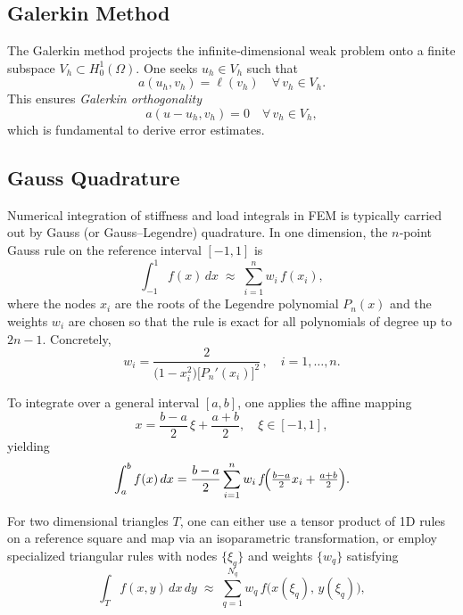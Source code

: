\subsection{Galerkin Method}

The Galerkin method projects the infinite‐dimensional weak problem onto a finite subspace $V_h\subset H_0^1(\Omega)$.  One seeks $u_h\in V_h$ such that
\begin{equation}
  a(u_h,v_h)=\ell(v_h)
  \quad\forall\,v_h\in V_h.
\end{equation}
This ensures \emph{Galerkin orthogonality}
\begin{equation}
  a(u-u_h,v_h)=0
  \quad\forall\,v_h\in V_h,
\end{equation}
which is fundamental to derive error estimates. \citep{ErnGuermond2004}

\subsection{Gauss Quadrature}

Numerical integration of stiffness and load integrals in FEM is typically carried out by Gauss (or Gauss–Legendre) quadrature.  In one dimension, the $n$‐point Gauss rule on the reference interval $[-1,1]$ is
\begin{equation}
  \int_{-1}^{1} f(x)\,dx
  \;\approx\;
  \sum_{i=1}^{n} w_i\,f(x_i),
\end{equation}
where the nodes $x_i$ are the roots of the Legendre polynomial $P_n(x)$ and the weights $w_i$ are chosen so that the rule is exact for all polynomials of degree up to $2n-1$.  Concretely,
\begin{equation}
  w_i = \frac{2}{\bigl(1 - x_i^2\bigr)\bigl[P_n'(x_i)\bigr]^2}\,,
  \quad i = 1,\dots,n.
\end{equation}

To integrate over a general interval $[a,b]$, one applies the affine mapping
\[
  x = \frac{b-a}{2}\,\xi + \frac{a+b}{2}, 
  \quad \xi\in[-1,1],
\]
yielding
\begin{equation}
  \int_a^b f(x)\,dx
  = \frac{b-a}{2}
    \sum_{i=1}^{n} w_i\,f\!\Bigl(\tfrac{b-a}{2}x_i + \tfrac{a+b}{2}\Bigr).
\end{equation}

For two dimensional triangles $T$, one can either use a tensor product of 1D rules on a reference square and map via an isoparametric transformation, or employ specialized triangular rules with nodes $\{\xi_q\}$ and weights $\{w_q\}$ satisfying
\begin{equation}
  \int_{T} f(x,y)\,dx\,dy
  \;\approx\;
  \sum_{q=1}^{N_q} w_q\,f\bigl(x(\xi_q),\,y(\xi_q)\bigr),
\end{equation}

